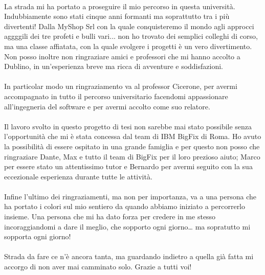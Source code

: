 \paragraph{}
La strada mi ha portato a proseguire il mio percorso in questa università. Indubbiamente sono stati cinque anni formanti ma soprattutto tra i più divertenti! Dalla MyShop Srl con la quale conquisteremo il mondo agli approcci aggggili dei tre profeti e bulli vari... non ho trovato dei semplici colleghi di corso, ma una classe affiatata, con la quale svolgere i progetti è un vero divertimento. Non posso inoltre non ringraziare amici e professori che mi hanno accolto a Dublino, in un'esperienza breve ma ricca di avventure e soddisfazioni.

\paragraph{}
In particolar modo un ringraziamento va al professor Cicerone, per avermi accompagnato in tutto il percorso universitario facendomi appassionare all'ingegneria del software e per avermi accolto come suo relatore.

\paragraph{}
Il lavoro svolto in questo progetto di tesi non sarebbe mai stato possibile senza l'opportunità che mi è stata concessa dal team di IBM BigFix di Roma. Ho avuto la possibilità di essere ospitato in una grande famiglia e per questo non posso che ringraziare Dante, Max e tutto il team di BigFix per il loro prezioso aiuto; Marco per essere stato un attentissimo tutor e Bernardo per avermi seguito con la sua eccezionale esperienza durante tutte le attività.

\paragraph{}
Infine l’ultimo dei ringraziamenti, ma non per importanza, va a una persona che ha portato i colori sul mio sentiero da quando abbiamo iniziato a percorrerlo insieme. Una persona che mi ha dato forza per credere in me stesso incoraggiandomi a dare il meglio, che sopporto ogni giorno… ma sopratutto mi sopporta ogni giorno!

\paragraph{}
Strada da fare ce n'è ancora tanta, ma guardando indietro a quella già fatta mi accorgo di non aver mai camminato solo. Grazie a tutti voi!